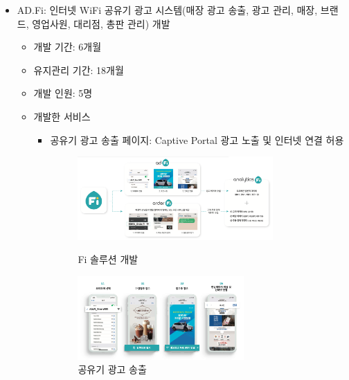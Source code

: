
\begin{itemize}
	\item AD.Fi: 인터넷 WiFi 공유기 광고 시스템(매장 광고 송출, 광고 관리, 매장, 브랜드, 영업사원, 대리점, 총판 관리) 개발
	      \begin{itemize}[label=$\star$]
		      \item 개발 기간: 6개월
		      \item 유지관리 기간: 18개월
		      \item 개발 인원: 5명
		      \item 개발한 서비스
		            \begin{itemize}
			            \item 공유기 광고 송출 페이지: Captive Portal 광고 노출 및 인터넷 연결 허용
			                  \begin{figure}[!ht]
				                  \begin{fullwidth}
					                  \parbox{0.8\textwidth}{
						                  \centering
						                  \includegraphics[width=0.8\textwidth]{images/ad-fi-platform.png}
						                  \caption*{Fi 솔루션 개발}
					                  }\qquad
					                  \parbox{0.68\textwidth}{
						                  \centering
						                  \includegraphics[width=0.68\textwidth]{images/ad-fi.png}
						                  \caption*{공유기 광고 송출}
					                  }
				                  \end{fullwidth}

\end{figure}
\end{itemize}
\end{itemize}
\end{itemize}
